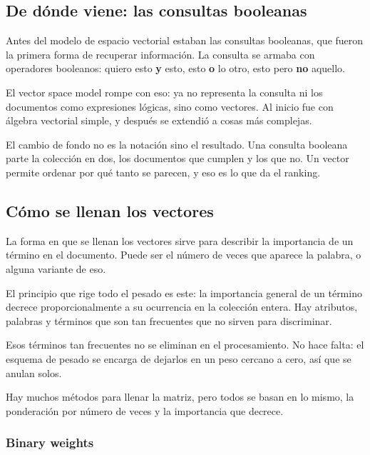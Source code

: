 \documentclass[11pt,letterpaper]{article}
\begin{document}
\subsection*{De dónde viene: las consultas booleanas}

Antes del modelo de espacio vectorial estaban las consultas
booleanas, que fueron la primera forma de recuperar información. La
consulta se armaba con operadores booleanos: quiero esto \textbf{y}
esto, esto \textbf{o} lo otro, esto pero \textbf{no} aquello.

El vector space model rompe con eso: ya no representa la consulta ni
los documentos como expresiones lógicas, sino como vectores. Al
inicio fue con álgebra vectorial simple, y después se extendió a
cosas más complejas.

\begin{idea}
    El cambio de fondo no es la notación sino el resultado. Una
    consulta booleana parte la colección en dos, los documentos que
    cumplen y los que no. Un vector permite ordenar por qué tanto se
    parecen, y eso es lo que da el ranking.
\end{idea}


\subsection*{Cómo se llenan los vectores}

La forma en que se llenan los vectores sirve para describir la
importancia de un término en el documento. Puede ser el número de
veces que aparece la palabra, o alguna variante de eso.

El principio que rige todo el pesado es este: la importancia general
de un término decrece proporcionalmente a su ocurrencia en la
colección entera. Hay atributos, palabras y términos que son tan
frecuentes que no sirven para discriminar.

\begin{ojo}
    Esos términos tan frecuentes no se eliminan en el
    procesamiento. No hace falta: el esquema de pesado se encarga de
    dejarlos en un peso cercano a cero, así que se anulan solos.
\end{ojo}

Hay muchos métodos para llenar la matriz, pero todos se basan en lo
mismo, la ponderación por número de veces y la importancia que
decrece.

\subsubsection*{Binary weights}
\end{document}
